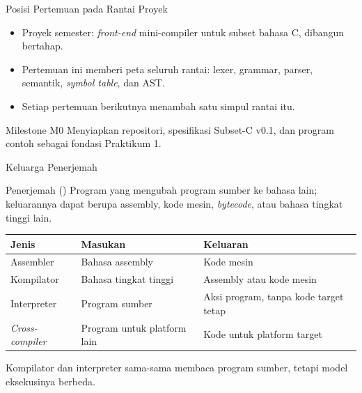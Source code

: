 \documentclass[aspectratio=169,10pt,t]{beamer}
\begin{document}
\begin{frame}{Posisi Pertemuan pada Rantai Proyek}

  \vspace{2pt}
  \begin{itemize}
    \item Proyek semester: \textit{front-end} mini-compiler untuk subset
          bahasa C, dibangun bertahap.
    \item Pertemuan ini memberi peta seluruh rantai: lexer, grammar,
          parser, semantik, \textit{symbol table}, dan AST.
    \item Setiap pertemuan berikutnya menambah satu simpul rantai itu.
  \end{itemize}

  \vspace{2pt}
  \begin{exampleblock}{Milestone M0}
    Menyiapkan repositori, spesifikasi Subset-C v0.1, dan program contoh
    sebagai fondasi Praktikum 1.
  \end{exampleblock}
\end{frame}

\begin{frame}{Keluarga Penerjemah}
  \begin{block}{Penerjemah ()}
    Program yang mengubah program sumber ke bahasa lain; keluarannya
    dapat berupa assembly, kode mesin, \textit{bytecode}, atau bahasa
    tingkat tinggi lain.
  \end{block}

  \vspace{4pt}
  \small
  \begin{tabular}{@{}p{3.1cm}p{4.6cm}p{5.7cm}@{}}
    \toprule
    \textbf{Jenis} & \textbf{Masukan} & \textbf{Keluaran} \\
    \midrule
    Assembler & Bahasa assembly & Kode mesin \\
    Kompilator & Bahasa tingkat tinggi & Assembly atau kode mesin \\
    Interpreter & Program sumber & Aksi program, tanpa kode target tetap \\
    \textit{Cross-compiler} & Program untuk platform lain & Kode untuk platform target \\
    \bottomrule
  \end{tabular}

  \vspace{4pt}
  {\footnotesize Kompilator dan interpreter sama-sama membaca program
  sumber, tetapi model eksekusinya berbeda.}
\end{frame}
\end{document}
